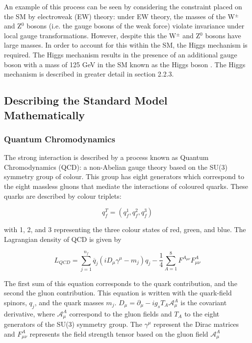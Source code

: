 \documentclass[12pt,a4paper,epsf,portrait,times,epsfig]{report}
\begin{document}
An example of this process can be seen by considering the constraint placed on the SM by electroweak (EW) theory: under EW theory, the masses of the W$^{\pm}$ and Z$^{0}$ bosons (i.e. the gauge bosons of the weak force) violate invariance under local gauge transformations. However, despite this the W$^{\pm}$ and Z$^{0}$ bosons have large masses. In order to account for this within the SM, the Higgs mechanism is required. The Higgs mechanism results in the presence of an additional gauge boson with a mass of 125 GeV in the SM known as the Higgs boson \cite{DiscoHiggsATLAS}\cite{DiscoHiggsCMS}. The Higgs mechanism is described in greater detail in section 2.2.3. \par

		\subsection{Describing the Standard Model Mathematically}
		
		\subsubsection{Quantum Chromodynamics}
		
		The strong interaction is described by a process known as Quantum Chromodynamics (QCD)\cite{Article:PDG}\cite{Article:QCDPrimer}: a non-Abelian gauge theory based on the SU(3) symmetry group of colour. This group has eight generators which correspond to the eight massless gluons that mediate the interactions of coloured quarks. These quarks are described by colour triplets:
		
		\begin{center}
			\begin{equation}
				q_{f}^{T} = (q_{f}^{1},q_{f}^{2},q_{f}^{3})
			\end{equation}
		\end{center}
	
		with 1, 2, and 3 representing the three colour states of red, green, and blue. 
		The Lagrangian density of QCD is given by
		
		\begin{center}
			\begin{equation}
				L_{QCD}=\sum_{j=1}^{n_{f}}\overline{q}_{j}(iD_{\mu}\gamma^{\mu}-m_{j})q_{j}-\frac{1}{4}\sum_{A=1}^{8}F^{A_{\mu\nu}}F_{\mu\nu}^{A}
			\end{equation}
		\end{center}
		
		The first sum of this equation corresponds to the quark contribution, and the second the gluon contribution. This equation is written with the quark-field spinors, $q_{j}$, and the quark masses $m_{j}$. $D_{\mu} = \partial_{\mu}-ig_{s}T_{A}\mathcal{A}_{\mu}^{A}$ is the covariant derivative, where $\mathcal{A}_{\mu}^{A}$ correspond to the gluon fields and $T_{A}$ to the eight generators of the SU(3) symmetry group. The $\gamma^{\mu}$ represent the Dirac matrices and $F_{\mu\nu}^{A}$ represents the field strength tensor based on the gluon field $\mathcal{A}_{\mu}^{A}$
		
\end{document}
